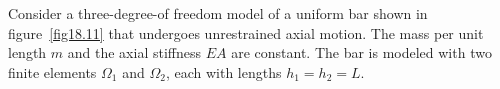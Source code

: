 \documentclass{AeroStructure-ERJohnson}
\begin{document}
\begin{example*}\label{ex18.2}\setcounter{equation}{0}\def\theequation{\alph{equation}}Consider a three-degree-of freedom model of a uniform bar shown in figure~\ref{fig18.11} that undergoes unrestrained axial motion. The mass per unit length $m$ and the axial stiffness $E A$ are constant. The bar is modeled with two finite elements $\Omega_1$ and $\Omega_2$, each with lengths $h_{1}=h_{2}=L$.

{\def\thefigure{18.11}
}


\end{example*}
\end{document}

